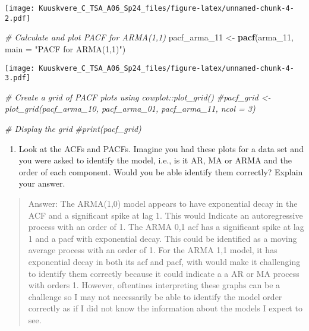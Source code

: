 \documentclass[
]{article}
\newenvironment{Shaded}{\begin{snugshade}}{\end{snugshade}}
\newcommand{\AttributeTok}[1]{\textcolor[rgb]{0.13,0.29,0.53}{#1}}
\newcommand{\CommentTok}[1]{\textcolor[rgb]{0.56,0.35,0.01}{\textit{#1}}}
\newcommand{\FunctionTok}[1]{\textcolor[rgb]{0.13,0.29,0.53}{\textbf{#1}}}
\newcommand{\NormalTok}[1]{#1}
\newcommand{\OtherTok}[1]{\textcolor[rgb]{0.56,0.35,0.01}{#1}}
\newcommand{\StringTok}[1]{\textcolor[rgb]{0.31,0.60,0.02}{#1}}
\providecommand{\tightlist}{%
  \setlength{\itemsep}{0pt}\setlength{\parskip}{0pt}}
\begin{document}
\texttt{[image: Kuuskvere\_C\_TSA\_A06\_Sp24\_files/figure-latex/unnamed-chunk-4-2.pdf]}

\begin{Shaded}
\begin{Highlighting}[]
\CommentTok{\# Calculate and plot PACF for ARMA(1,1)}
\NormalTok{pacf\_arma\_11 }\OtherTok{\textless{}{-}} \FunctionTok{pacf}\NormalTok{(arma\_11, }\AttributeTok{main =} \StringTok{"PACF for ARMA(1,1)"}\NormalTok{)}
\end{Highlighting}
\end{Shaded}

\texttt{[image: Kuuskvere\_C\_TSA\_A06\_Sp24\_files/figure-latex/unnamed-chunk-4-3.pdf]}

\begin{Shaded}
\begin{Highlighting}[]
\CommentTok{\# Create a grid of PACF plots using cowplot::plot\_grid()}
\CommentTok{\#pacf\_grid \textless{}{-} plot\_grid(pacf\_arma\_10, pacf\_arma\_01, pacf\_arma\_11, ncol = 3)}

\CommentTok{\# Display the grid}
\CommentTok{\#print(pacf\_grid)}
\end{Highlighting}
\end{Shaded}

\begin{enumerate}
\def\labelenumi{(\alph{enumi})}
\setcounter{enumi}{3}
\tightlist
\item
  Look at the ACFs and PACFs. Imagine you had these plots for a data set
  and you were asked to identify the model, i.e., is it AR, MA or ARMA
  and the order of each component. Would you be able identify them
  correctly? Explain your answer.
\end{enumerate}

\begin{quote}
Answer: The ARMA(1,0) model appears to have exponential decay in the ACF
and a significant spike at lag 1. This would Indicate an autoregressive
process with an order of 1. The ARMA 0,1 acf has a significant spike at
lag 1 and a pacf with exponential decay. This could be identified as a
moving average process with an order of 1. For the ARMA 1,1 model, it
has exponential decay in both its acf and pacf, with would make it
challenging to identify them correctly because it could indicate a a AR
or MA process with orders 1. However, oftentines interpreting these
graphs can be a challenge so I may not necessarily be able to identify
the model order correctly as if I did not know the information about the
models I expect to see.
\end{quote}
\end{document}
